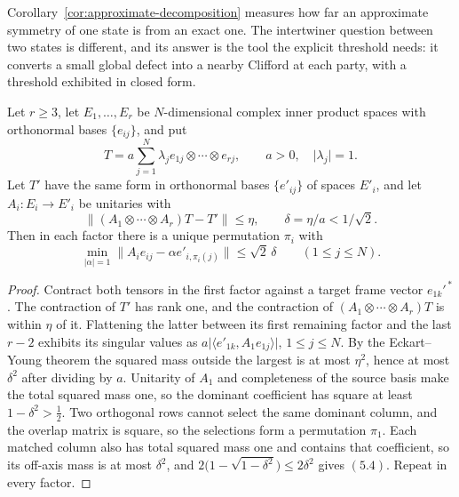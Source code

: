 Corollary~\ref{cor:approximate-decomposition} measures how far an
approximate symmetry of one state is from an exact one.  The intertwiner
question between two states is different, and its answer is the tool the
explicit threshold needs: it converts a small global defect into a nearby
Clifford at each party, with a threshold exhibited in closed form.

\begin{lemma}
\label{lem:quantitative-axes}
Let \(r\geq3\), let \(E_1,\ldots,E_r\) be \(N\)-dimensional complex inner
product spaces with orthonormal bases \(\{e_{ij}\}\), and put
\[
 T=a\sum_{j=1}^N\lambda_je_{1j}\otimes\cdots\otimes e_{rj},
 \qquad a>0,\quad\lvert\lambda_j\rvert=1 .
\]
Let \(T'\) have the same form in orthonormal bases \(\{e'_{ij}\}\) of
spaces \(E'_i\), and let \(A_i:E_i\to E'_i\) be unitaries with
\[
 \lVert(A_1\otimes\cdots\otimes A_r)T-T'\rVert\leq\eta,
 \qquad\delta=\eta/a<1/\sqrt2 .
\]
Then in each factor there is a unique permutation \(\pi_i\) with
\[
 \min_{\lvert\alpha\rvert=1}
 \lVert A_ie_{ij}-\alpha e'_{i,\pi_i(j)}\rVert\leq\sqrt2\,\delta
 \qquad(1\leq j\leq N).                                  \tag{5.4}
\]
\end{lemma}

\begin{proof}
Contract both tensors in the first factor against a target frame vector
\(e_{1k}'^{\,*}\).  The contraction of \(T'\) has rank one, and the
contraction of \((A_1\otimes\cdots\otimes A_r)T\) is within \(\eta\) of it.
Flattening the latter between its first remaining factor and the last
\(r-2\) exhibits its singular values as
\(a\lvert\langle e'_{1k},A_1e_{1j}\rangle\rvert\), \(1\leq j\leq N\).  By
the Eckart--Young theorem the squared mass outside the largest is at most
\(\eta^2\), hence at most \(\delta^2\) after dividing by \(a\).
Unitarity of \(A_1\) and completeness of the source basis make the total
squared mass one, so the dominant coefficient has square at least
\(1-\delta^2>\frac12\).  Two orthogonal rows cannot select the same
dominant column, and the overlap matrix is square, so the selections form a
permutation \(\pi_1\).  Each matched column also has total squared mass one
and contains that coefficient, so its off-axis mass is at most
\(\delta^2\), and \(2\bigl(1-\sqrt{1-\delta^2}\bigr)\leq2\delta^2\) gives
\((5.4)\).  Repeat in every factor.
\end{proof}

